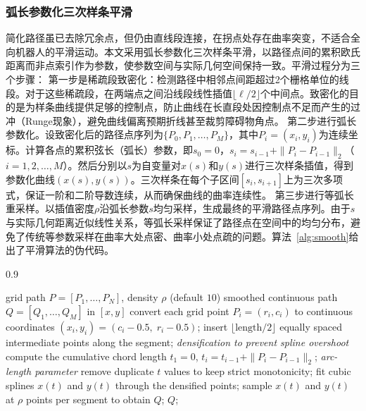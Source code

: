 \documentclass[lettersize,journal]{IEEEtran}
\begin{document}
\subsubsection{弧长参数化三次样条平滑}
简化路径虽已去除冗余点，但仍由直线段连接，在拐点处存在曲率突变，不适合全向机器人的平滑运动。本文采用弧长参数化三次样条平滑，以路径点间的累积欧氏距离而非点索引作为参数，使参数空间与实际几何空间保持一致。平滑过程分为三个步骤：
第一步是稀疏段致密化：检测路径中相邻点间距超过2个栅格单位的线段。对于这些稀疏段，在两端点之间沿线段线性插值$\lfloor \ell / 2 \rfloor$个中间点。致密化的目的是为样条曲线提供足够的控制点，防止曲线在长直段处因控制点不足而产生的过冲（Runge现象），避免曲线偏离预期折线甚至裁剪障碍物角点。
第二步进行弧长参数化。设致密化后的路径点序列为$\{P_0, P_1, \ldots, P_M\}$，其中$P_i = (x_i, y_i)$为连续坐标。计算各点的累积弦长（弧长）参数，即$s_0 = 0$，$s_i = s_{i-1} + \|P_i - P_{i-1}\|_2$（$i = 1, 2, \ldots, M$）。然后分别以$s$为自变量对$x(s)$和$y(s)$进行三次样条插值，得到参数化曲线$(x(s), y(s))$。三次样条在每个子区间$[s_i, s_{i+1}]$上为三次多项式，保证一阶和二阶导数连续，从而确保曲线的曲率连续性。
第三步进行等弧长重采样。以插值密度$\rho$沿弧长参数$s$均匀采样，生成最终的平滑路径点序列。由于$s$与实际几何距离近似线性关系，等弧长采样保证了路径点在空间中的均匀分布，避免了传统等参数采样在曲率大处点密、曲率小处点疏的问题。算法~\textcolor{blue}{\ref{alg:smooth}}给出了平滑算法的伪代码。
\begin{algorithm}[!t]
\caption{Arc-length parameterized cubic spline smoothing}
\label{alg:smooth}
\begin{spacing}{0.9}
\begin{algorithmic}[1]
\REQUIRE grid path $P = [P_1, \ldots, P_N]$, density $\rho$ (default $10$)
\ENSURE smoothed continuous path $Q = [Q_1, \ldots, Q_M]$ in $[x, y]$
\STATE convert each grid point $P_i = (r_i, c_i)$ to continuous coordinates $(x_i, y_i) = (c_i - 0.5,\; r_i - 0.5)$;
\STATE insert $\lfloor \mathrm{length} / 2 \rfloor$ equally spaced intermediate points along the segment; \quad\textit{densification to prevent spline overshoot}
\ENDFOR
\STATE compute the cumulative chord length $t_1 = 0$, $t_i = t_{i-1} + \|P_i - P_{i-1}\|_2$; \quad\textit{arc-length parameter}
\STATE remove duplicate $t$ values to keep strict monotonicity;
\STATE fit cubic splines $x(t)$ and $y(t)$ through the densified points;
\STATE sample $x(t)$ and $y(t)$ at $\rho$ points per segment to obtain $Q$;
\RETURN $Q$;
\end{algorithmic}
\end{spacing}
\end{algorithm}
\end{document}
